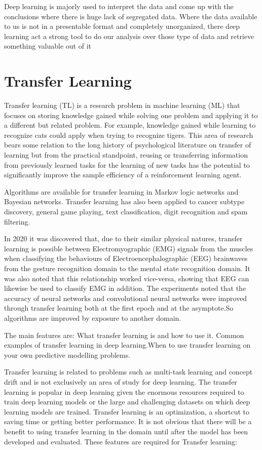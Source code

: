 Deep learning is majorly used to interpret the data and come up with the conclusions where there is huge lack of segregated data. Where the data available to us is not in a presentable format and completely unorganized, there deep learning act a strong tool to do our analysis over those type of data and retrieve something valuable out of it



\section{Transfer Learning}

Transfer learning (TL) is a research problem in machine learning (ML) that focuses on storing knowledge gained while solving one problem and applying it to a different but related problem\cite{19}. For example, knowledge gained while learning to recognize cats could apply when trying to recognize tigers. This area of research bears some relation to the long history of psychological literature on transfer of learning but from the practical standpoint, reusing or transferring information from previously learned tasks for the learning of new tasks has the potential to significantly improve the sample efficiency of a reinforcement learning agent.

Algorithms are available for transfer learning in Markov logic networks and Bayesian networks. Transfer learning has also been applied to cancer subtype discovery, general game playing, text classification, digit recognition and spam filtering.

In 2020 it was discovered that, due to their similar physical natures, transfer learning is possible between Electromyographic (EMG) signals from the muscles when classifying the behaviours of Electroencephalographic (EEG) brainwaves from the gesture recognition domain to the mental state recognition domain\cite{20}. It was also noted that this relationship worked vice-versa, showing that EEG can likewise be used to classify EMG in addition. The experiments noted that the accuracy of neural networks and convolutional neural networks were improved through transfer learning both at the first epoch and at the asymptote.So algorithms are improved by exposure to another domain.

The main features are: What transfer learning is and how to use it. Common examples of transfer learning in deep learning.When to use transfer learning on your own predictive modelling problems.

Transfer learning is related to problems such as multi-task learning and concept drift and is not exclusively an area of study for deep learning. The transfer learning is popular in deep learning given the enormous resources required to train deep learning models or the large and challenging datasets on which deep learning models are trained. Transfer learning is an optimization, a shortcut to saving time or getting better performance. It is not obvious that there will be a benefit to using transfer learning in the domain until after the model has been developed and evaluated. These features  are required for Transfer learning:

